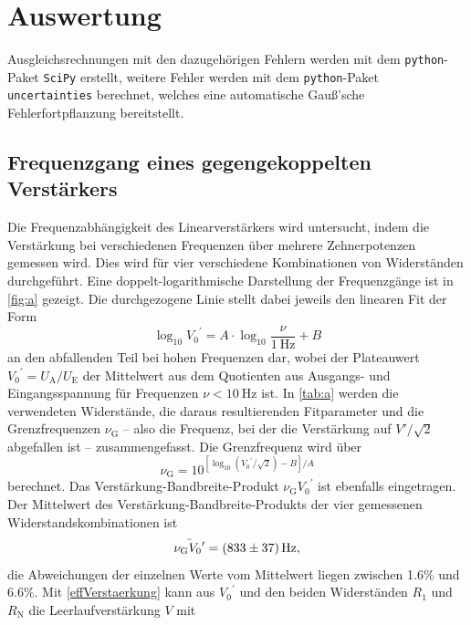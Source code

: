 \section{Auswertung}
\label{sec:evaluation}
Ausgleichsrechnungen mit den dazugehörigen Fehlern werden mit dem \texttt{python}-Paket \texttt{SciPy} \cite{scipy} erstellt, weitere Fehler werden mit dem \texttt{python}-Paket \texttt{uncertainties} \cite{uncertain} berechnet, welches eine automatische Gauß'sche Fehlerfortpflanzung bereitstellt.

\subsection{Frequenzgang eines gegengekoppelten Verst\"{a}rkers}
\label{Frequenzgang}
Die Frequenzabhängigkeit des Linearverstärkers wird untersucht, indem die Verstärkung bei verschiedenen Frequenzen über mehrere Zehnerpotenzen gemessen wird. Dies wird für vier verschiedene Kombinationen von Widerständen durchgeführt. Eine doppelt-logarithmische Darstellung der Frequenzgänge ist in \autoref{fig:a} gezeigt. Die durchgezogene Linie stellt dabei jeweils den linearen Fit der Form
\begin{equation}
	\log_{10} {V_0}^\prime = A \cdot \log_{10} \frac{\nu}{\SI{1}{\hertz}} + B
	\label{linear_fit}
\end{equation}
an den abfallenden Teil bei hohen Frequenzen dar, wobei der Plateauwert ${V_0}^\prime = U_\text{A} / U_\text{E}$ der Mittelwert aus dem Quotienten aus Ausgangs- und Eingangsspannung für Frequenzen $\nu < \SI{10}{\hertz}$ ist. In \autoref{tab:a} werden die verwendeten Widerstände, die daraus resultierenden Fitparameter und die Grenzfrequenzen $\nu_\text{G}$ -- also die Frequenz, bei der die Verstärkung auf $V'/\sqrt{2}$ abgefallen ist -- zusammengefasst. Die Grenzfrequenz wird über
\begin{equation*}
	\nu_\text{G} = 10^{\left[\log_{10}\left({V_0}^\prime/\sqrt{2}\right) - B\right] / A}
\end{equation*}
berechnet. Das Verstärkung-Bandbreite-Produkt $\nu_\text{G}{V_0}^\prime$ ist ebenfalls eingetragen. Der Mittelwert des Verstärkung-Bandbreite-Produkts der vier gemessenen Widerstandskombinationen ist
\begin{equation*}
	\bar{\nu_\text{G}{V_0}^\prime} = \SI{833 \pm 37}{\hertz},
\end{equation*}
die Abweichungen der einzelnen Werte vom Mittelwert liegen zwischen 1.6\% und 6.6\%. Mit \autoref{effVerstaerkung} kann aus ${V_0}^\prime$ und den beiden Widerständen $R_1$ und $R_\text{N}$ die Leerlaufverstärkung $V$ mit
